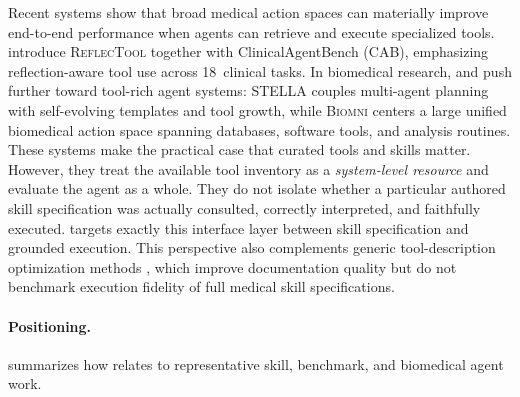 Recent systems show that broad medical action spaces can materially improve end-to-end performance when agents can retrieve and execute specialized tools.
\citet{reflectool2025} introduce \textsc{ReflecTool} together with ClinicalAgentBench (CAB), emphasizing reflection-aware tool use across 18~clinical tasks.
In biomedical research, \citet{stella2025} and \citet{biomni2025} push further toward tool-rich agent systems: \textsc{STELLA} couples multi-agent planning with self-evolving templates and tool growth, while \textsc{Biomni} centers a large unified biomedical action space spanning databases, software tools, and analysis routines.
These systems make the practical case that curated tools and skills matter.
However, they treat the available tool inventory as a \emph{system-level resource} and evaluate the agent as a whole.
They do not isolate whether a particular authored skill specification was actually consulted, correctly interpreted, and faithfully executed.
\medskillbench targets exactly this interface layer between skill specification and grounded execution.
This perspective also complements generic tool-description optimization methods \citep{easytool2024,play2prompt2025,tracefree2026}, which improve documentation quality but do not benchmark execution fidelity of full medical skill specifications.

\paragraph{Positioning.}
 summarizes how \medskillbench relates to representative skill, benchmark, and biomedical agent work.

